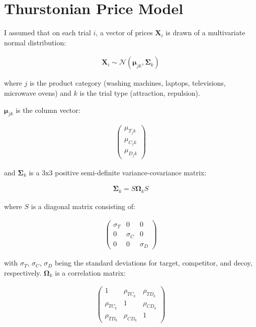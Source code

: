 \section{Thurstonian Price Model}

I assumed that on each trial $i$, a vector of prices $\textbf{X}_{i}$ is drawn of a multivariate normal distribution:

\begin{align}
    \textbf{X}_{i}\sim \mathcal{N}(\boldsymbol{\mu}_{jk},\boldsymbol{\Sigma}_{k})
\end{align}

where $j$ is the product category (washing machines, laptops, televisions, microwave ovens) and $k$ is the trial type (attraction, repulsion). 

$\boldsymbol{\mu}_{jk}$ is the column vector:

\begin{align}
   \begin{pmatrix}
      \mu_{T_jk} \\
      \mu_{C_jk} \\
      \mu_{D_jk}
      \end{pmatrix}
   \label{eqn:mu_price}
\end{align}

and $\boldsymbol{\Sigma}_{k}$ is a $3\text{x}3$ positive semi-definite variance-covariance matrix:

\begin{align}
   \boldsymbol{\Sigma}_{k}=S\boldsymbol{\Omega}_{k}S
\end{align}

where $S$ is a diagonal matrix consisting of: 

\begin{align}
   \begin{pmatrix}
      \sigma_{T} & 0 & 0 \\
      0 & \sigma_{C} & 0 \\
      0 & 0 & \sigma_{D} 
   \end{pmatrix}
\end{align}

with $\sigma_{T}$, $\sigma_{C}$, $\sigma_{D}$ being the standard deviations for target, competitor, and decoy, respectively. $\boldsymbol{\Omega}_{k}$ is a correlation matrix:

\begin{align}
   \begin{pmatrix}
      1 & \rho_{TC_k} & \rho_{TD_k} \\
      \rho_{TC_k} & 1 & \rho_{CD_k} \\
      \rho_{TD_k} & \rho_{CD_k} & 1 
   \end{pmatrix}
\end{align}

